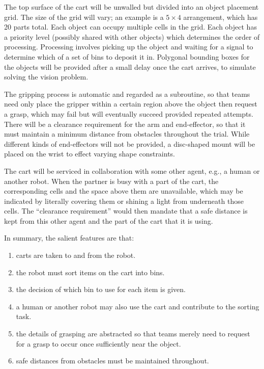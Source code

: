 \documentclass{amsart}
\theoremstyle{definition}
\begin{document}
The top surface of the cart will be unwalled but divided into an object
placement grid. The size of the grid will vary; an example is a $5 \times 4$
arrangement, which has 20 parts total. Each object can occupy multiple cells in the
grid. Each object has a priority level (possibly shared with other objects)
which determines the order of processing. Processing involves picking up the
object and waiting for a signal to determine which of a set of bins to deposit
it in. Polygonal bounding boxes for the objects will be provided after a small
delay once the cart arrives, to simulate solving the vision problem.

The gripping process is automatic and regarded as a subroutine, so that teams
need only place the gripper within a certain region above the object then
request a grasp, which may fail but will eventually succeed provided repeated
attempts.  There will be a clearance requirement for the arm and end-effector,
so that it must maintain a minimum distance from obstacles throughout the trial.
While different kinds of end-effectors will not be provided, a disc-shaped mount
will be placed on the wrist to effect varying shape constraints.

The cart will be serviced in collaboration with some other agent, e.g., a human
or another robot.  When the partner is busy with a part of the cart, the
corresponding cells and the space above them are unavailable, which may be
indicated by literally covering them or shining a light from underneath those
cells. The ``clearance requirement'' would then mandate that a safe distance is
kept from this other agent and the part of the cart that it is using.

In summary, the salient features are that:
\begin{enumerate}
\item carts are taken to and from the robot.
\item the robot must sort items on the cart into bins.
\item the decision of which bin to use for each item is given.
\item a human or another robot may also use the cart and contribute to the sorting task.
\item the details of grasping are abstracted so that teams merely need to request for a grasp to occur once sufficiently near the object.
\item safe distances from obstacles must be maintained throughout.
\end{enumerate}
\end{document}
